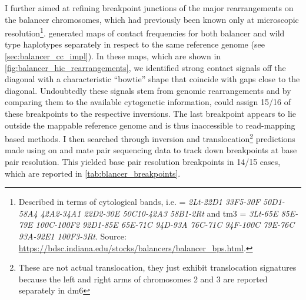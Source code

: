 I further aimed at refining breakpoint junctions of the major rearrangements on
the balancer chromosomes, which had previously been known only at microscopic
resolution\footnote{\label{footnote:balancer_karyotype}
    Described in terms of cytological bands, i.e. \cyo = \textit{2Lt-22D1
    33F5-30F 50D1-58A4 42A2-34A1 22D2-30E 50C10-42A3 58B1-2Rt} and
    \ac{tm3} = \textit{3Lt-65E 85E-79E 100C-100F2 92D1-85E 65E-71C
    94D-93A 76C-71C 94F-100C 79E-76C 93A-92E1 100F3-3Rt}.
    Source: \url{https://bdsc.indiana.edu/stocks/balancers/balancer_bps.html}.}.
\alek generated \hic maps of contact frequencies for both balancer and wild type
haplotypes separately in respect to the same reference genome (see
\cref{sec:balancer_cc_impl}). In these maps, which are shown in
\cref{fig:balancer_hic_rearrangements}, we identified strong contact signals off
the diagonal with a characteristic ``bowtie'' shape that coincide with gaps
close to the diagonal. Undoubtedly these signals stem from genomic
rearrangements and by comparing them to the available cytogenetic information,
\yad could assign 15/16 of these breakpoints to the respective inversions.
The last breakpoint appears to lie outside the mappable reference genome and is
thus inaccessible to read-mapping based methods.
I then searched through inversion and
translocation\footnote{These are not actual translocation, they just exhibit
    translocation signatures because the left and right arms of chromosomes 2
    and 3 are reported separately in \ac{dm6}}
predictions made using \delly on \wgs and mate pair sequencing data to
track down breakpoints at base pair resolution. This yielded base pair
resolution breakpoints in 14/15 cases, which are reported in
\cref{tab:blancer_breakpoints}.


